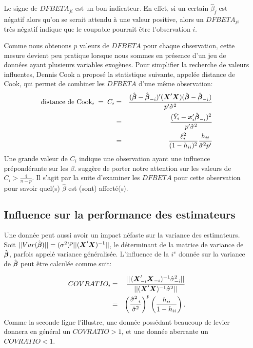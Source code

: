 Le signe de $DFBETA_{ji}$ est un bon indicateur. En effet, si un certain $\hat\beta_j$ est négatif alors qu'on se serait attendu à une valeur positive, alors un $DFBETA_{ji}$ très négatif indique que le \og coupable \fg pourrait être l'observation $i$.

Comme nous obtenons $p$ valeurs de $DFBETA$
pour chaque observation, cette mesure devient peu pratique lorsque
nous sommes en présence d'un jeu de données ayant plusieurs
variables exogènes. Pour simplifier la recherche de valeurs influentes, Dennis Cook a proposé la statistique suivante, appelée distance
de Cook, qui permet de combiner les $DFBETA$ d'une m\^eme observation:
\begin{eqnarray*}
\text{distance de Cook}_i\;=\;C_i & = & {(\hat{\mbox{\boldmath$\beta$}}-\hat{\mbox{\boldmath$\beta$}}_{-i})'(\mbox{\boldmath$X$\unboldmath}'\mbox{\boldmath$X$\unboldmath})(\hat{\mbox{\boldmath$\beta$}}-\hat{\mbox{\boldmath$\beta$}}_{-i})
\over p' \hat\sigma^2} \\
& = & \frac{(\hat Y_i-\mbox{\boldmath$x$\unboldmath}_i'\hat{\mbox{\boldmath$\beta$}}_{-i})^2}{p'\hat\sigma^2} \\
& = & \frac{\hat\varepsilon_i^2}{(1-h_{ii})^2}\frac{h_{ii}}{\hat\sigma^2 p'} \\
\end{eqnarray*}
 Une grande valeur de $C_i$ indique une observation
ayant une influence prépondérante sur les $\beta$. \citet{Fox:91} suggère de porter notre attention sur les valeurs de $C_i>\frac{4}{n-p}$. Il s'agit par la suite
d'examiner les $DFBETA$ pour cette observation pour savoir quel(s)
$\hat\beta$ est (sont) affecté(s).


\subsection{Influence sur la performance des estimateurs}
Une donnée peut aussi avoir un impact néfaste sur la variance des estimateurs. Soit $||Var(\hat{\mbox{\boldmath$\beta$}})|| = (\sigma^2)^p||(\mbox{\boldmath$X$\unboldmath}'\mbox{\boldmath$X$\unboldmath})^{-1}||$, le déterminant de la matrice de variance de $\hat{\mbox{\boldmath$\beta$}}$, parfois appelé variance généralisée. L'influence de la $i^e$ donnée sur la variance de $\hat{\mbox{\boldmath$\beta$}}$ peut \^etre calculée comme suit:

\begin{eqnarray*}COVRATIO_i&=&{||(\mbox{\boldmath$X$\unboldmath}_{-i}'\mbox{\boldmath$X$\unboldmath}_{-i})^{-1}\hat\sigma_{-i}^2||
\over||(\mbox{\boldmath$X$\unboldmath}'\mbox{\boldmath$X$\unboldmath})^{-1}\hat\sigma^2||}\\
&=&\left({\hat\sigma_{-i}^{2}\over
\hat\sigma^{2}}\right)^p\left({h_{ii}\over1-h_{ii}}\right).\end{eqnarray*}
Comme la seconde ligne l'illustre, une donnée possédant beaucoup de levier
donnera en général un $COVRATIO>1$, et une donnée aberrante un $COVRATIO<1$.

